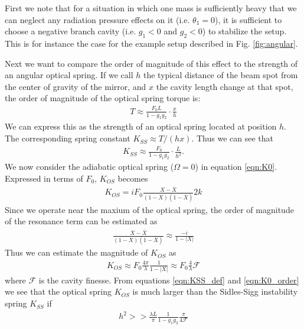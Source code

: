\documentclass[%
 reprint,
 amsmath,amssymb,
 aps,
]{revtex4-1}
\begin{document}
First we note that for a situation in which one mass is sufficiently heavy that we can neglect any radiation pressure effects on it (i.e. $\theta_1=0$), it is sufficient to choose a negative branch cavity (i.e. $g_1<0$ and $g_2<0$) to stabilize the setup. This is for instance the case for the example setup described in Fig. \ref{fig:angular}.

Next we want to compare the order of magnitude of this effect to the strength of an angular optical spring. If we call $h$ the typical distance of the beam spot from the center of gravity of the mirror, and $x$ the cavity length change at that spot, the order of magnitude of the optical spring torque is:
\begin{eqnarray}
T\approx \frac{F_0 L}{1-g_1g_2}\cdot \frac{x}{h}
\end{eqnarray}
We can express this as the strength of an optical spring located at position $h$. The corresponding spring constant $K_{SS} \approx T/(h x)$. Thus we can see that
\begin{eqnarray}
\label{eqn:KSS_def}
K_{SS} \approx \frac{F_0}{1-g_1g_2}\cdot \frac{L}{h^2}.
\end{eqnarray}
We now consider the adiabatic optical spring ($\Omega=0$) in equation \ref{eqn:K0}.  Expressed in terms of $F_0$, $K_{OS}$ becomes
\begin{eqnarray}
\label{eqn:KOS_exact}
K_{OS}=i F_0 \frac{X-\overline{X}}{(1-X)(1-\overline{X})}   2 k
\end{eqnarray}
Since we operate near the maxium of the optical spring, the order of magnitude of the resonance term can be estimated as
\begin{eqnarray}
\label{eqn:res_est}
\frac{X-\overline{X}}{(1-X)(1-\overline{X})} \approx \frac{-i}{1-|X|}
\end{eqnarray}
Thus we can estimate the magnitude of  $K_{OS}$ as
\begin{eqnarray}
\label{eqn:K0_order}
K_{OS} \approx F_0 \frac{4\pi}{\lambda}\frac{1}{1-|X|} \approx F_0 \frac{4}{\lambda} \mathcal{F}
\end{eqnarray}
where $\mathcal{F}$ is the cavity finesse.
From equations \ref{eqn:KSS_def} and \ref{eqn:K0_order} we see that the optical spring $K_{OS}$  is much larger than the Sidles-Sigg instability spring $K_{SS}$ if
\begin{eqnarray}
\label{eqn:h2}
h^2 >> \frac{\lambda L}{\pi} \frac{1}{1-g_1 g_2} \frac{\pi}{4 \mathcal{F}}
\end{eqnarray}
\end{document}
